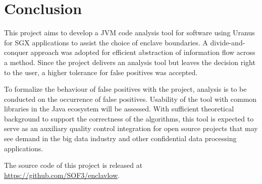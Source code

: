 \section{Conclusion}\label{sec:conclusion}
This project aims to develop a \ac{JVM} code analysis tool
for software using Uranus for \ac{SGX} applications
to assist the choice of enclave boundaries.
A divide-and-conquer approach was adopted for
efficient abstraction of information flow across a method.
Since the project delivers an analysis tool
but leaves the decision right to the user,
a higher tolerance for false positives was accepted.

To formalize the behaviour of false positives with the project,
analysis is to be conducted on the occurrence of false positives.
Usability of the tool with common libraries in the Java ecosystem will be assessed.
With sufficient theoretical background to support the correctness of the algorithms,
this tool is expected to serve as an auxiliary quality control integration
for open source projects that may see demand in the big data industry
and other confidential data processing applications.

The source code of this project is released at
\url{https://github.com/SOF3/enclavlow}.
